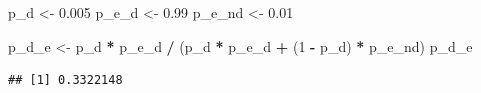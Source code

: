 \documentclass[
]{article}
\newenvironment{Shaded}{\begin{snugshade}}{\end{snugshade}}
\newcommand{\DecValTok}[1]{\textcolor[rgb]{0.00,0.00,0.81}{#1}}
\newcommand{\FloatTok}[1]{\textcolor[rgb]{0.00,0.00,0.81}{#1}}
\newcommand{\NormalTok}[1]{#1}
\newcommand{\OperatorTok}[1]{\textcolor[rgb]{0.81,0.36,0.00}{\textbf{#1}}}
\newcommand{\StringTok}[1]{\textcolor[rgb]{0.31,0.60,0.02}{#1}}
\begin{document}
\begin{Shaded}
\begin{Highlighting}[]
\NormalTok{p\_d \textless{}{-}}\StringTok{ }\FloatTok{0.005}
\NormalTok{p\_e\_d \textless{}{-}}\StringTok{ }\FloatTok{0.99}
\NormalTok{p\_e\_nd \textless{}{-}}\StringTok{ }\FloatTok{0.01}

\NormalTok{p\_d\_e \textless{}{-}}\StringTok{ }\NormalTok{p\_d }\OperatorTok{*}\StringTok{ }\NormalTok{p\_e\_d }\OperatorTok{/}\StringTok{ }\NormalTok{(p\_d }\OperatorTok{*}\StringTok{ }\NormalTok{p\_e\_d }\OperatorTok{+}\StringTok{ }\NormalTok{(}\DecValTok{1} \OperatorTok{{-}}\StringTok{ }\NormalTok{p\_d) }\OperatorTok{*}\StringTok{ }\NormalTok{p\_e\_nd)}
\NormalTok{p\_d\_e}
\end{Highlighting}
\end{Shaded}

\begin{verbatim}
## [1] 0.3322148
\end{verbatim}
\end{document}
